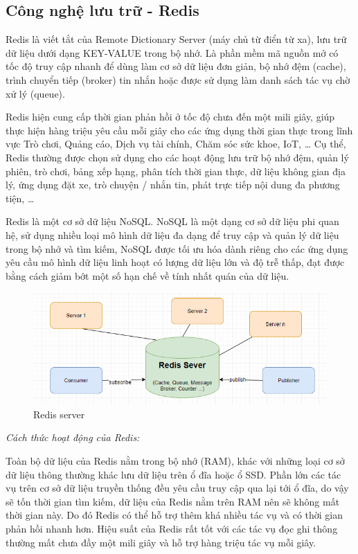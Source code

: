 \subsection{Công nghệ lưu trữ - Redis}
Redis là viết tắt của Remote Dictionary Server
(máy chủ từ điển từ xa), lưu trữ dữ liệu dưới dạng
KEY-VALUE trong bộ nhớ. Là phần mềm mã nguồn mở có tốc độ
truy cập nhanh để dùng làm cơ sở dữ liệu đơn giản, bộ nhớ đệm (cache),
trình chuyển tiếp (broker) tin nhắn hoặc
được sử dụng làm danh sách tác vụ chờ xử lý (queue). 

Redis hiện cung cấp thời gian phản hồi ở tốc độ chưa đến
một mili giây, giúp thực hiện hàng triệu yêu cầu mỗi giây cho
các ứng dụng thời gian thực trong lĩnh vực Trò chơi, Quảng cáo, Dịch
vụ tài chính, Chăm sóc sức khoe, IoT, … Cụ thể, Redis thường được chọn
sử dụng cho các hoạt động lưu trữ bộ nhớ đệm, quản lý phiên, trò chơi,
bảng xếp hạng, phân tích thời gian thực, dữ liệu không gian
địa lý, ứng dụng đặt xe, trò chuyện / nhắn tin, phát trực tiếp
nội dung đa phương tiện, …

Redis là một cơ sở dữ liệu NoSQL. NoSQL là một dạng cơ sở dữ liệu
phi quan hệ, sử dụng nhiều loại mô hình dữ liệu đa dạng để
truy cập và quản lý dữ liệu trong bộ nhớ và tìm kiếm, NoSQL được
tối ưu hóa dành riêng cho các ứng dụng yêu cầu mô hình dữ liệu
linh hoạt có lượng dữ liệu lớn và độ trễ thấp, đạt được bằng cách
giảm bớt một số hạn chế về tính nhất quán của dữ liệu.

\begin{figure}[H]
    \centering
    \includegraphics[width=14cm]{images/redis.png}
    \caption{Redis server}
\end{figure}

\textit{Cách thức hoạt động của Redis:}

Toàn bộ dữ liệu của Redis nằm trong bộ nhớ (RAM), khác với những loại 
cơ sở dữ liệu thông thường khác lưu dữ liệu trên ổ đĩa hoặc ổ SSD. 
Phần lớn các tác vụ trên cơ sở dữ liệu truyền thống đều yêu cầu 
truy cập qua lại tới ổ đĩa, do vậy sẽ tốn thời gian tìm kiếm, 
dữ liệu của Redis nằm trên RAM nên sẽ không mất thời gian này. 
Do đó Redis có thể hỗ trợ thêm khá nhiều tác vụ và có thời gian 
phản hồi nhanh hơn. Hiệu suất của Redis rất tốt với các tác 
vụ đọc ghi thông thường mất chưa đầy một mili giây và hỗ trợ 
hàng triệu tác vụ mỗi giây. 

